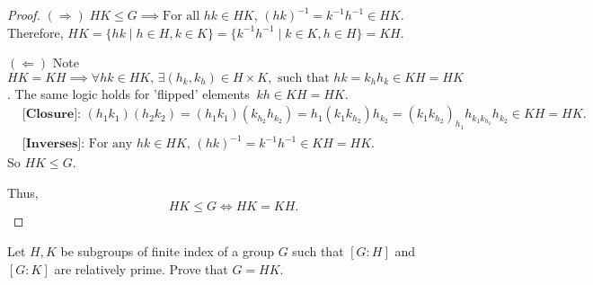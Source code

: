 \documentclass[addpoints,10pt]{exam}
\theoremstyle{plain}
\theoremstyle{definition}
\newtheorem{prob}[thm]{Problem}
\theoremstyle{plain}
\theoremstyle{plain}
\theoremstyle{definition}
\let\oldprob\prob
\let\endoldprob\endprob
\renewenvironment{prob}
  {\begin{singlespace}\oldprob}
  {\endoldprob\end{singlespace}}
\newcommand{\belowtitle}{\leavevmode\newline}
\newcommand{\Observe}{\text{Observe.}}
\newcommand{\IF}{\mathbf{(\Rightarrow)}}
\newcommand{\FI}{\mathbf{(\Leftarrow)}}
\begin{document}
\begin{proof}\belowtitle
  $\IF\;HK\leq G\implies\text{For all }hk\in HK$, $(hk)^{-1}=k^{-1}h^{-1}\in HK$. Therefore, $HK=\{hk\mid h\in H, k\in K\}=\{k^{-1}h^{-1}\mid k\in K,h\in H\}=KH$.

  $\FI$ Note $HK=KH\implies \forall hk\in HK,\,\exists (h_{k},k_{h})\in H\times K, \text{ such that }hk=k_{h}h_{k}\in KH=HK$. The same logic holds for 'flipped' elements$\;\;kh\in KH=HK$. \Observe
  \begin{align*}
    &\textbf{[Closure]: } (h_{1}k_{1})(h_{2}k_{2})=(h_{1}k_{1})(k_{h_{2}}h_{k_{2}})=h_{1}(k_{1}k_{h_{2}})h_{k_{2}}=(k_{1}k_{h_{2}})_{h_{1}}h_{k_{1}k_{h_{2}}}h_{k_{2}}\in KH=HK.\\
    &\textbf{[Inverses]: }\text{For any }hk\in HK,\,(hk)^{-1}=k^{-1}h^{-1}\in KH=HK.
  \end{align*}
  So $HK\leq G$.

  Thus,
  $$HK\leq G\iff HK=KH.$$
\end{proof}
\newpage

\begin{prob}
  Let $H,K$ be subgroups of finite index of a group $G$ such that $[G:H]$ and $[G:K]$ are relatively prime. Prove that $G=HK$.
\end{prob}
\end{document}
